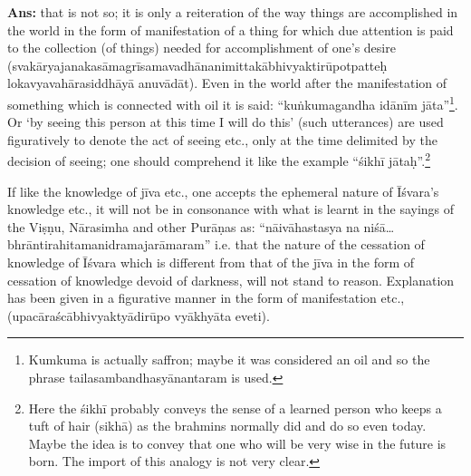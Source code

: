 \textbf{Ans:} that is not so; it is only a reiteration of the way things are accomplished in the world in the form of manifestation of a thing for which due attention is paid to the collection (of things) needed for accomplishment of one’s desire (svakāryajanakasāmagrīsamavadhānanimittakābhivyaktirūpotpatteḥ lokavyavahārasiddhāyā anuvādāt). Even in the world after the manifestation of something which is connected with oil it is said:  “kuṅkumagandha idānīm jāta”\footnote{Kumkuma is actually saffron; maybe it was considered an oil and so the phrase tailasambandhasyānantaram is used.}. Or ‘by seeing this person at this time I will do this’ (such utterances) are used figuratively to denote the act of seeing etc., only at the time delimited by the decision of seeing; one should comprehend it like the example “śikhī jātaḥ”.\footnote{Here the śikhī probably conveys the sense of a learned person who keeps a tuft of hair (sikhā) as the brahmins normally did and do so even today. Maybe the idea is to convey that one who will be very wise in the future is born. The import of this analogy is not very clear.} 

If like the knowledge of jīva etc., one accepts the ephemeral nature of Īśvara’s knowledge etc., it will not be in consonance with what is learnt in the sayings of the Viṣṇu, Nārasimha and other Purāṇas as: “nāivāhastasya na niśā…bhrāntirahitamanidramajarāmaram” i.e. that the nature of the cessation of knowledge of Īśvara which is different from that of the jīva in the form of cessation of knowledge devoid of darkness, will not stand to reason. Explanation has been given in a figurative manner in the form of manifestation etc., (upacāraścābhivyaktyādirūpo vyākhyāta eveti).


